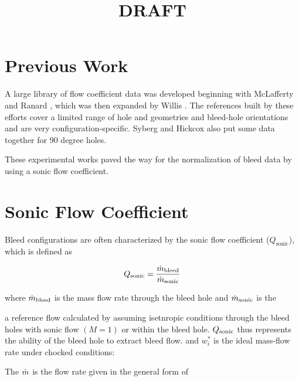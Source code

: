 \documentclass{article}
\begin{document}
\title{DRAFT}
\tableofcontents


\section{Previous Work}


A large library of flow coefficient data was developed beginning with McLafferty and Ranard \cite{McLafferty1958}, which was then expanded by Willis \cite{Willis1995}. The references built by these efforts cover a limited range of hole and geometries and bleed-hole orientations and are very configuration-specific. Syberg and Hickcox \cite{Syberg1973b} also put some data together for 90 degree holes.

These experimental works paved the way for the normalization of bleed data by using a sonic flow coefficient.

\section{Sonic Flow Coefficient}

Bleed configurations are often characterized by the sonic flow coefficient ($Q_\textrm{sonic}$), which is defined as

$$ Q_{\textrm{sonic}} = \frac{\dot{m}_{\textrm{bleed}}}{\dot{m}_{\textrm{sonic}}} $$

where $\dot{m}_{\textrm{bleed}}$ is the mass flow rate through the bleed hole and $\dot{m}_{\textrm{sonic}}$ is the 

a reference flow calculated by assuming isetnropic conditions through the bleed holes with sonic flow $(M=1)$ or within the bleed hole. $Q_{\textrm{sonic}}$ thus represents the ability of the bleed hole to extract bleed flow.
and $w_i^*$ is the ideal mass-flow rate under chocked conditions:

The $\dot{m}$ is the flow rate given in the general form of

\end{document}
